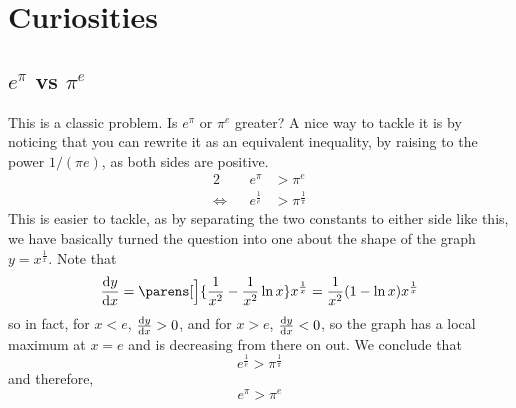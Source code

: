 \section{Curiosities}

\subsection[\texorpdfstring{\(e^\pi\) vs \(\pi^e\)}{e\^{}pi vs pi\^{}e}]
           {\boldmath\(e^\pi\) vs \(\pi^e\)}

This is a classic problem. Is \(e^\pi\) or \(\pi^e\) greater? A nice way to
tackle it is by noticing that you can rewrite it as an equivalent inequality, by
raising to the power \(1 / (\pi e)\), as both sides are positive.
\begin{alignat*}2
 && e^\pi &> \pi^e \\
 \iff{}&& e^{\frac 1e} &> \pi^{\frac 1\pi}
\end{alignat*}
This is easier to tackle, as by separating the two constants to either side like
this, we have basically turned the question into one about the shape of the
graph \(y = x^{\frac 1x}\). Note that
\begin{equation*}
 \dv<y>{x} = \parens[\Big]{\frac 1{x^2} - \frac 1{x^2}\ln x} x^{\frac 1x}
           = \frac 1{x^2} (1 - \ln x) x^{\frac 1x}
\end{equation*}
so in fact, for \(x < e\), \(\dv<y>{x} > 0\), and for
\(x > e\), \(\dv<y>{x} < 0\), so the graph has a local maximum at \(x = e\) and
is decreasing from there on out. We conclude that
\begin{equation*}
 e^{\frac 1e} > \pi^{\frac 1\pi}
\end{equation*}
and therefore,
\begin{equation*}
 e^\pi > \pi^e
\end{equation*}
